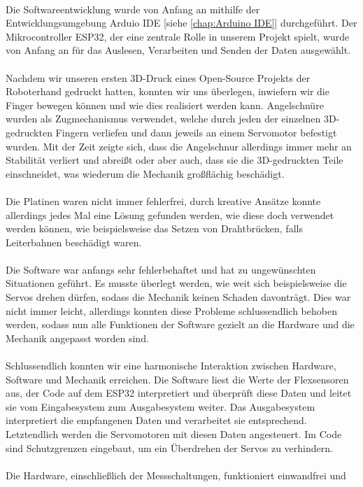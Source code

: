 \documentclass[titlepage,12pt,twoside]{article}
\begin{document}
\\
Die Softwareentwicklung wurde von Anfang an mithilfe der Entwicklungsumgebung Arduio IDE
[siehe \textcolor{blue}{\autoref{chap:Arduino IDE}}] durchgeführt. Der Mikrocontroller ESP32, der eine zentrale Rolle 
in unserem Projekt spielt, wurde von Anfang an für das Auslesen, Verarbeiten 
und Senden der Daten ausgewählt. \\
\\
Nachdem wir unseren ersten 3D-Druck eines Open-Source Projekts der Roboterhand 
gedruckt hatten, konnten wir uns überlegen, inwiefern wir die Finger bewegen 
können und wie dies realisiert werden kann. Angelschnüre wurden als Zugmechanismus 
verwendet, welche durch jeden der einzelnen 3D-gedruckten Fingern verliefen 
und dann jeweils an einem Servomotor befestigt wurden. Mit der Zeit zeigte 
sich, dass die Angelschnur allerdings immer mehr an Stabilität verliert und 
abreißt oder aber auch, dass sie die 3D-gedruckten Teile einschneidet, was 
wiederum die Mechanik großflächig beschädigt. \\
\\
Die Platinen waren nicht immer fehlerfrei, durch kreative Ansätze konnte 
allerdings jedes Mal eine Lösung gefunden werden, wie diese doch verwendet 
werden können, wie beispielsweise das Setzen von Drahtbrücken, falls 
Leiterbahnen beschädigt waren. \\
\\
Die Software war anfangs sehr fehlerbehaftet und hat zu ungewünschten 
Situationen geführt. Es musste überlegt werden, wie weit sich beispielsweise 
die Servos drehen dürfen, sodass die Mechanik keinen Schaden davonträgt. Dies 
war nicht immer leicht, allerdings konnten diese Probleme schlussendlich 
behoben werden, sodass nun alle Funktionen der Software gezielt an die Hardware 
und die Mechanik angepasst worden sind. \\
\\
Schlussendlich konnten wir eine harmonische Interaktion zwischen Hardware, 
Software und Mechanik erreichen. Die Software liest die Werte der Flexsensoren 
aus, der Code auf dem ESP32 interpretiert und überprüft diese Daten und leitet 
sie vom Eingabesystem zum Ausgabesystem weiter. Das Ausgabesystem interpretiert 
die empfangenen Daten und verarbeitet sie entsprechend. Letztendlich werden 
die Servomotoren mit diesen Daten angesteuert. Im Code sind Schutzgrenzen eingebaut, 
um ein Überdrehen der Servos zu verhindern. \\
\\
Die Hardware, einschließlich der Messschaltungen, funktioniert einwandfrei und 
\end{document}
